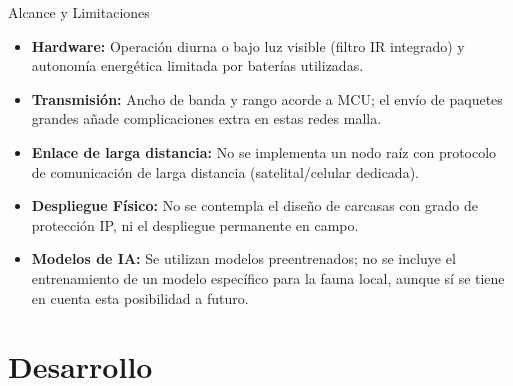 \documentclass[10pt]{beamer}
\begin{document}
\begin{frame}{Alcance y Limitaciones}
  \begin{itemize}
    \setlength{\itemsep}{1.0em}
    \item \textbf{Hardware:} Operación diurna o bajo luz visible (filtro IR integrado) y autonomía energética limitada por baterías utilizadas.
    \item \textbf{Transmisión:} Ancho de banda y rango acorde a MCU; el envío de paquetes grandes añade complicaciones extra en estas redes malla.
    \item \textbf{Enlace de larga distancia:} No se implementa un nodo raíz con protocolo de comunicación de larga distancia (satelital/celular dedicada).
    \item \textbf{Despliegue Físico:} No se contempla el diseño de carcasas con grado de protección IP, ni el despliegue permanente en campo.
    \item \textbf{Modelos de IA:} Se utilizan modelos preentrenados; no se incluye el entrenamiento de un modelo específico para la fauna local, aunque sí se tiene en cuenta esta posibilidad a futuro.
  \end{itemize}
\end{frame}

\section{Desarrollo}
\end{document}
